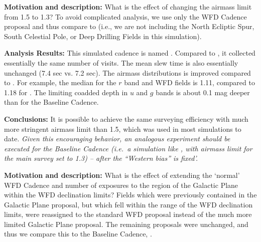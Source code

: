 

{\bf Motivation and description:} What is the effect of changing the airmass
limit from 1.5 to 1.3? To avoid complicated analysis, we use only the WFD
Cadence proposal and thus compare to  (i.e., we are not
including the North Ecliptic Spur, South Celestial Pole, or Deep Drilling Fields
in this simulation).

 {\bf Analysis Results:}  This simulated cadence is named
 . Compared to
 , it collected essentially the same number of
 visits. The mean slew time is also essentially unchanged (7.4 sec vs.
 7.2 sec). The airmass distributions is improved compared to
 . For example, the median for the $r$ band and
 WFD fields is 1.11, compared to 1.18 for .  The
 limiting coadded depth in $u$ and $g$ bands is about 0.1 mag deeper than
 for the Baseline Cadence.

{\bf Conclusions:}  It is possible to achieve the same surveying
efficiency with much more stringent airmass limit than 1.5, which was
used in most simulations to date.  {\it Given this encouraging
behavior, an analogous experiment should be executed for the Baseline
Cadence (i.e.\ a simulation like , with airmass
limit for the main survey set to 1.3) -- after the ``Western bias'' is
fixed'.}




{\bf Motivation and description:} What is the effect of extending the
`normal' WFD Cadence and number of exposures to the region of the
Galactic Plane within the WFD declination limits?  Fields which were
previously contained in the Galactic Plane proposal, but which fell
within the range of the WFD declination limits, were reassigned to the
standard WFD proposal instead of the much more limited Galactic Plane
proposal. The remaining proposals were unchanged, and thus we compare
this to the Baseline Cadence, .

